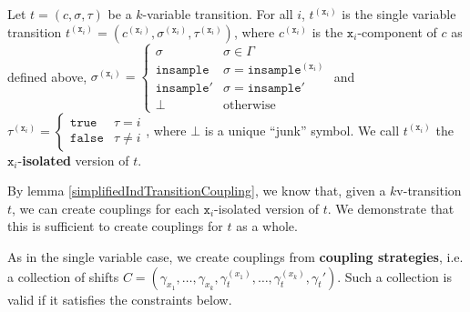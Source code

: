 \begin{defn}
    Let $t = (c, \sigma, \tau)$ be a $k$-variable transition. For all $i$, $t^{(\texttt{x}_i)}$ is the single variable transition $t^{(\texttt{x}_i)} = (c^{(\texttt{x}_i)}, \sigma^{(\texttt{x}_i)}, \tau^{(\texttt{x}_i)})$, where $c^{(\texttt{x}_i)}$ is the $\texttt{x}_i$-component of $c$ as defined above, $\sigma^{(\texttt{x}_i)} = \begin{cases}
        \sigma & \sigma \in \Gamma\\
        \texttt{insample} & \sigma = \texttt{insample}^{(\texttt{x}_i)}\\
        \texttt{insample}' & \sigma = \texttt{insample}'\\
        \bot & \text{otherwise}
    \end{cases}$ and $\tau^{(\texttt{x}_i)} = \begin{cases}
        \texttt{true} & \tau = i\\
        \texttt{false} & \tau \neq i
    \end{cases}$, where $\bot$ is a unique ``junk'' symbol. We call $t^{(\texttt{x}_i)}$ the $\texttt{x}_i$-\textbf{isolated} version of $t$. 
\end{defn}

By lemma \ref{simplifiedIndTransitionCoupling}, we know that, given a $k$v-transition $t$, we can create couplings for each $\texttt{x}_i$-isolated version of $t$. We demonstrate that this is sufficient to create couplings for $t$ as a whole. 

As in the single variable case, we create couplings from \textbf{coupling strategies}, i.e. a collection of shifts $C = (\gamma_{x_1}, \ldots, \gamma_{x_k}, \gamma_t^{(x_1)}, \ldots, \gamma_t^{(x_k)}, \gamma_t')$. Such a collection is valid if it satisfies the constraints below. 


